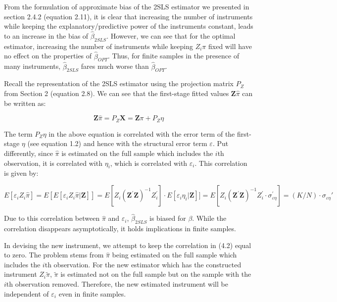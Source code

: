 \par From the formulation of approximate bias of the 2SLS estimator we presented in section 2.4.2 (equation 2.11), it is clear that increasing the number of instruments while keeping the explanatory/predictive power of the instruments constant, leads to an increase in the bias of $\hat\beta_{2SLS}$. However, we can see that for the optimal estimator, increasing the number of instruments while keeping $Z_i\pi$ fixed will have no effect on the properties of $\hat\beta_{OPT}$. Thus, for finite samples in the presence of many instruments, $\hat\beta_{2SLS}$ fares much worse than $\hat\beta_{OPT}$. 
\par Recall the representation of the 2SLS estimator using the projection matrix $P_Z$ from Section 2 (equation 2.8). We can see that the first-stage fitted values $\mathbf Z\hat{\pi}$ can be written as:

\begin{equation}
\mathbf Z\hat{\pi} = P_Z\mathbf X = \mathbf Z \pi + P_Z\eta
\end{equation}

The term $P_Z\eta$ in the above equation is correlated with the error term of the first-stage $\eta$ (see equation 1.2) and hence with the structural error term $\varepsilon$. Put differently, since $\hat \pi$ is estimated on the full sample which includes the $i$th observation, it is correlated with $\eta_i$, which is correlated with $\varepsilon_i$. This correlation is given by:

\begin{equation}
E[\varepsilon_{i}Z_{i}\hat{\pi}]
=E[E[\varepsilon_i Z_i\hat\pi|\mathbf Z]]
=E[Z_i(\mathbf Z^\prime \mathbf Z)^{-1} Z_i^\prime] \cdot E[\varepsilon_i \eta_i|\mathbf Z]]
=E[Z_i(\mathbf Z^\prime \mathbf Z)^{-1} Z_i^\prime \cdot \sigma_{\varepsilon\eta}^\prime]
=(K/N)\cdot\sigma_{\varepsilon\eta}'
\end{equation}

Due to this correlation between $\hat \pi$ and $\varepsilon_i$, $\hat\beta_{2SLS}$ is biased for $\beta$. While the correlation disappears asymptotically, it holds implications in finite samples. 

\par In devising the new instrument, we attempt to keep the correlation in (4.2) equal to zero. The problem stems from $\hat \pi$ being estimated on the full sample which includes the $i$th observation. For the new estimator which has the constructed instrument $Z_{i}\tilde{\pi}$, $\tilde\pi$ is estimated not on the full sample but on the sample with the $i$th observation removed. Therefore, the new estimated instrument will be independent of $\varepsilon_i$ even in finite samples.

